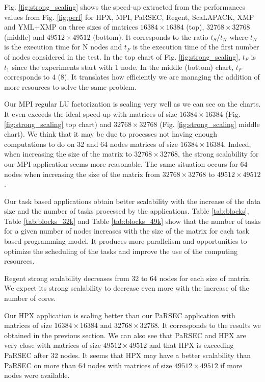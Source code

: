 Fig. \ref{fig:strong_scaling} shows the speed-up extracted from the performances values from Fig. \ref{fig:perf} for HPX, MPI, PaRSEC, Regent, ScaLAPACK, XMP and YML+XMP on three sizes of matrices $16384 \times 16384$ (top), $32768 \times 32768$ (middle) and $49512 \times 49512$ (bottom).
It corresponds to the ratio $t_S/t_N$ where $t_N$ is the execution time for N nodes and $t_F$ is the execution time of the first number of nodes considered in the test.
In the top chart of Fig. \ref{fig:strong_scaling}, $t_F$ is $t_1$ since the experiments start with 1 node.
In the middle (bottom) chart, $t_F$ corresponds to 4 (8).
It translates how efficiently we are managing the addition of more resources to solve the same problem.

Our MPI regular LU factorization is scaling very well as we can see on the charts.
It even exceeds the ideal speed-up with matrices of size $16384 \times 16384$ (Fig. \ref{fig:strong_scaling} top chart) and $32768 \times 32768$ (Fig. \ref{fig:strong_scaling} middle chart).
We think that it may be due to processes not having enough computations to do on 32 and 64 nodes matrices of size $16384 \times 16384$.
Indeed, when increasing the size of the matrix to $32768 \times 32768$, the strong scalability for our MPI application seems more reasonable.
The same situation occurs for 64 nodes when increasing the size of the matrix from $32768 \times 32768$ to $49512 \times 49512$.

Our task based applications obtain better scalability with the increase of the data size and the number of tasks processed by the applications.
Table \ref{tab:blocks}, Table \ref{tab:blocks_32k} and Table \ref{tab:blocks_49k} show that the number of tasks for a given number of nodes increases with the size of the matrix for each task based programming model.
It produces more parallelism and opportunities to optimize the scheduling of the tasks and improve the use of the computing resources.

Regent strong scalability decreases from 32 to 64 nodes for each size of matrix.
We expect its strong scalability to decrease even more with the increase of the number of cores.

Our HPX application is scaling better than our PaRSEC application with matrices of size $16384 \times 16384$ and $32768 \times 32768$.
It corresponds to the results we obtained in the previous section.
We can also see that PaRSEC and HPX are very close with matrices of size $49512 \times 49512$ and that HPX is exceeding PaRSEC after 32 nodes.
It seems that HPX may have a better scalability than PaRSEC on more than 64 nodes with matrices of size $49512 \times 49512$ if more nodes were available.


